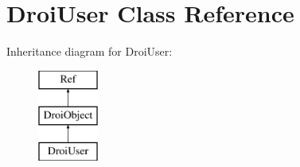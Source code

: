 \hypertarget{class_droi_user}{}\section{Droi\+User Class Reference}
\label{class_droi_user}
Inheritance diagram for Droi\+User\+:\begin{figure}[H]
\begin{center}
\leavevmode
\includegraphics[height=3.000000cm]{db/d70/class_droi_user}
\end{center}
\end{figure}
